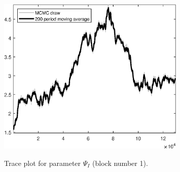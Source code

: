 \begin{figure}[H]
\centering
  \includegraphics[width=0.8\textwidth]{BRS_sectoral_wo_fixed_cost/graphs/TracePlot_Psi_I_blck_1}\\
    \caption{Trace plot for parameter ${\Psi_I}$ (block number 1).}
\end{figure}
